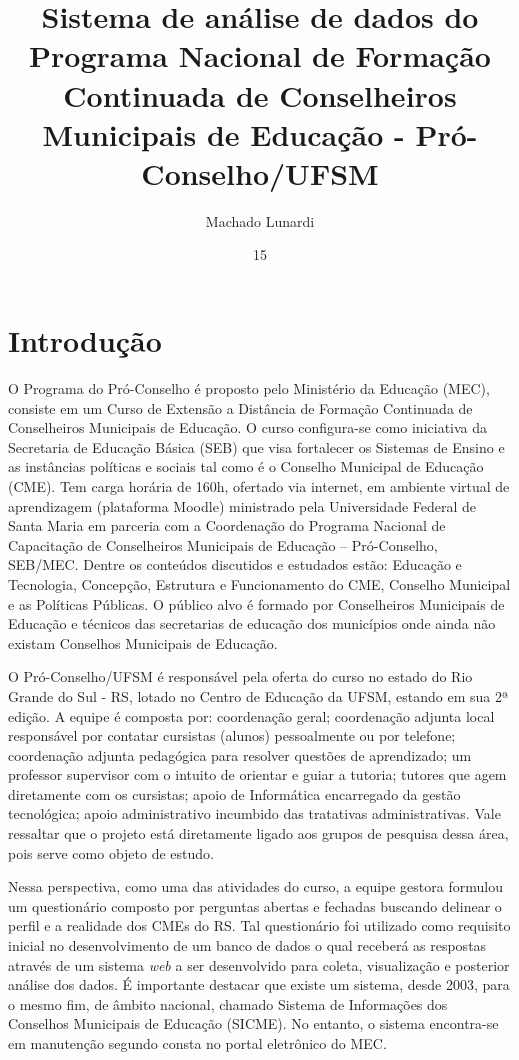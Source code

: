 \documentclass[projtg]{mdtufsm}
\title{Sistema de análise de dados do Programa Nacional de Formação Continuada de Conselheiros Municipais de Educação - Pró-Conselho/UFSM}
\author{Machado Lunardi}{Gabriel}
\institute{Centro de Tecnologia}
\date{15}{Agosto}{2014}
\begin{document}
\maketitle
\setlength{\baselineskip}{1.5\baselineskip}

\chapter{Introdução}

O Programa do Pró-Conselho é proposto pelo Ministério da Educação (MEC), consiste em um Curso de Extensão a Distância de Formação Continuada de Conselheiros Municipais de Educação. O curso configura-se como iniciativa da Secretaria de Educação Básica (SEB) que visa fortalecer os Sistemas de Ensino e as instâncias políticas e sociais tal como é o Conselho Municipal de Educação (CME). Tem carga horária de 160h, ofertado via internet, em ambiente virtual de aprendizagem (plataforma Moodle) ministrado pela Universidade Federal de Santa Maria em parceria com a Coordenação do Programa Nacional de Capacitação de Conselheiros Municipais de Educação – Pró-Conselho, SEB/MEC. Dentre os conteúdos discutidos e estudados estão: Educação e Tecnologia, Concepção, Estrutura e Funcionamento do CME, Conselho Municipal e as Políticas Públicas. O público alvo é formado por Conselheiros Municipais de Educação e técnicos das secretarias de educação dos municípios onde ainda não existam Conselhos Municipais de Educação. 

 O Pró-Conselho/UFSM é responsável pela oferta do curso no estado do Rio Grande do Sul - RS, lotado no Centro de Educação da UFSM, estando em sua 2ª edição. A equipe é composta por: coordenação geral; coordenação adjunta local responsável por contatar cursistas (alunos) pessoalmente ou por telefone; coordenação adjunta pedagógica para resolver questões de aprendizado; um professor supervisor com o intuito de orientar e guiar a tutoria; tutores que agem diretamente com os cursistas; apoio de Informática encarregado da gestão tecnológica; apoio administrativo incumbido das tratativas administrativas. Vale ressaltar que o projeto está diretamente ligado aos grupos de pesquisa dessa área, pois serve como objeto de estudo. 

Nessa perspectiva, como uma das atividades do curso, a equipe gestora formulou um questionário composto por perguntas abertas e fechadas buscando delinear o perfil e a realidade dos CMEs do RS. Tal questionário foi utilizado como requisito inicial no desenvolvimento de um banco de dados o qual receberá as respostas através de um sistema {\it web} a ser desenvolvido para coleta, visualização e posterior análise dos dados. É importante destacar que existe um sistema, desde 2003, para o mesmo fim, de âmbito nacional, chamado Sistema de Informações dos Conselhos Municipais de Educação (SICME). No entanto, o sistema encontra-se em manutenção segundo consta no portal eletrônico do MEC.
\end{document}
